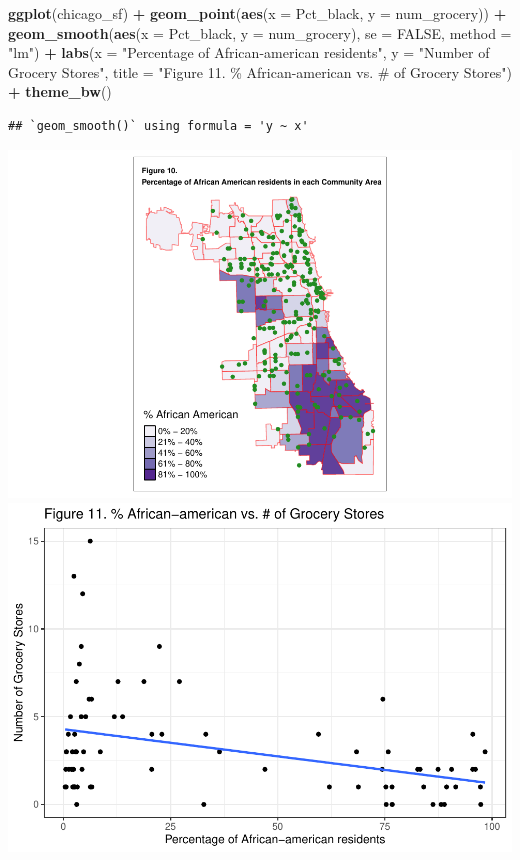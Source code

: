 \documentclass[
]{article}
\newenvironment{Shaded}{\begin{snugshade}}{\end{snugshade}}
\newcommand{\AttributeTok}[1]{\textcolor[rgb]{0.13,0.29,0.53}{#1}}
\newcommand{\ConstantTok}[1]{\textcolor[rgb]{0.56,0.35,0.01}{#1}}
\newcommand{\FunctionTok}[1]{\textcolor[rgb]{0.13,0.29,0.53}{\textbf{#1}}}
\newcommand{\NormalTok}[1]{#1}
\newcommand{\SpecialCharTok}[1]{\textcolor[rgb]{0.81,0.36,0.00}{\textbf{#1}}}
\newcommand{\StringTok}[1]{\textcolor[rgb]{0.31,0.60,0.02}{#1}}
\begin{document}
\begin{Shaded}
\begin{Highlighting}[]
\FunctionTok{ggplot}\NormalTok{(chicago\_sf) }\SpecialCharTok{+}
  \FunctionTok{geom\_point}\NormalTok{(}\FunctionTok{aes}\NormalTok{(}\AttributeTok{x =}\NormalTok{ Pct\_black, }\AttributeTok{y =}\NormalTok{ num\_grocery)) }\SpecialCharTok{+}
  \FunctionTok{geom\_smooth}\NormalTok{(}\FunctionTok{aes}\NormalTok{(}\AttributeTok{x =}\NormalTok{ Pct\_black, }\AttributeTok{y =}\NormalTok{ num\_grocery), }\AttributeTok{se =} \ConstantTok{FALSE}\NormalTok{, }\AttributeTok{method =} \StringTok{"lm"}\NormalTok{) }\SpecialCharTok{+}
  \FunctionTok{labs}\NormalTok{(}\AttributeTok{x =} \StringTok{"Percentage of African{-}american residents"}\NormalTok{,}
       \AttributeTok{y =} \StringTok{"Number of Grocery Stores"}\NormalTok{,}
       \AttributeTok{title =} \StringTok{"Figure 11. \% African{-}american vs. \# of Grocery Stores"}\NormalTok{) }\SpecialCharTok{+}
  \FunctionTok{theme\_bw}\NormalTok{()}
\end{Highlighting}
\end{Shaded}

\begin{verbatim}
## `geom_smooth()` using formula = 'y ~ x'
\end{verbatim}

\includegraphics[width=0.5\linewidth]{Sam-Song_Coding-Sample_files/figure-latex/unnamed-chunk-11-1}
\includegraphics[width=0.5\linewidth]{Sam-Song_Coding-Sample_files/figure-latex/unnamed-chunk-11-2}
\end{document}
